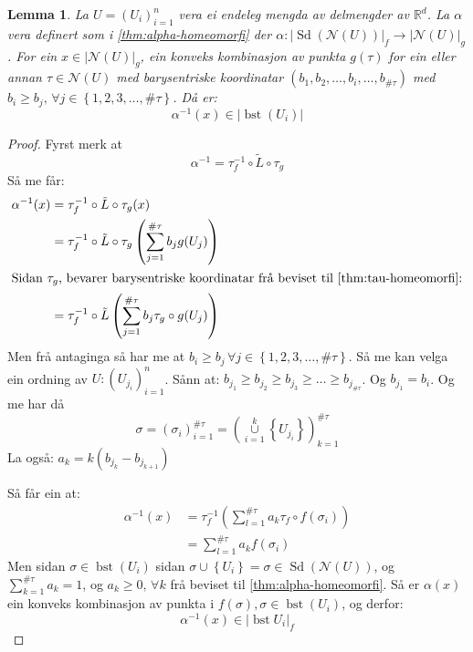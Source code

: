 \documentclass[a4paper, 12pt, norsk]{article}
\theoremstyle{plain}
\newtheorem{lemma}[theorem]{Lemma}
\theoremstyle{definition}
\newcommand{\Rb}{\mathbb{R}}
\newcommand{\Nc}{\mathcal{N}}
\newcommand{\union}{ \mathop{\cup}\limits }
\newcommand{\gr}[1]{ \lvert #1 \rvert } %
\newcommand{\set}[1]{ \left \{ #1 \right \} } %
\newcommand{\tuple}[1]{ \left( #1 \right) } %
\DeclareMathOperator{\Sd}{Sd}
\DeclareMathOperator{\bst}{bst}
\begin{document}
\begin{lemma} \label{thm:bst-betingingar}
	La \( U = \tuple{U_i}_{i=1}^n \) vera ei endeleg mengda av delmengder av \( \Rb^d \). La \( \alpha \) vera definert som i \autoref{thm:alpha-homeomorfi} der \( \alpha: \gr{\Sd(\Nc(U))}_f \to \gr{\Nc(U)}_g \). For ein \( x \in \gr{\Nc(U)}_g \), ein konveks kombinasjon av punkta \( g(\tau) \) for ein eller annan \( \tau \in \Nc(U) \) med barysentriske koordinatar \( \tuple{b_1, b_2,\dots, b_i, \dots, b_{\#\tau}} \) med \( b_i \geq b_j, \, \forall j \in \set{1, 2, 3, \dots, \#\tau} \). Då er:
	\[ 
		\alpha^{-1}(x) \in \gr{\bst(U_i)}
	\]
\end{lemma}

\begin{proof}
	Fyrst merk at
	\[
		\alpha^{-1} = \tau_f^{-1} \circ \tilde{L} \circ \tau_g
	\]
	Så me får:
	\begin{align*}
		\alpha^{-1}(x) &= \tau_f^{-1} \circ \tilde{L} \circ \tau_g (x) \\
		&= \tau_f^{-1} \circ \tilde{L} \circ \tau_g \tuple{\sum_{j=1}^{\#\tau} b_j g(U_j)} \\
		\intertext{Sidan \( \tau_g \), bevarer barysentriske koordinatar frå beviset til \autoref{thm:tau-homeomorfi}:}
		&= \tau_f^{-1} \circ \tilde{L} \tuple{\sum_{j=1}^{\#\tau} b_j \tau_g \circ g(U_j)} \\
	\end{align*}
	Men frå antaginga så har me at \( b_i \geq b_j \, \forall j \in \set{1, 2, 3, \dots, \#\tau} \). Så me kan velga ein ordning av \( U : \tuple{U_{j_i}}_{i=1}^n \). Sånn at: \( b_{j_1} \geq b_{j_2} \geq b_{j_3} \geq \dots \geq b_{j_{\#\tau}} \). Og \( b_{j_1}=b_i \). Og me har då 
	\[
		\sigma = \tuple{\sigma_i}_{i=1}^{\#\tau} = \tuple{\union_{i=1}^k \set{U_{j_i}}}_{k=1}^{\#\tau} 
	\]
	La også: \( a_k = k\tuple{b_{j_k}-b_{j_{k+1}}} \)

	Så får ein at:
	\begin{align*}
		\alpha^{-1}(x) &= \tau_f^{-1} \tuple{\sum_{l=1}^{\#\tau}a_k \tau_f \circ f(\sigma_i)} \\
		&= \sum_{l=1}^{\#\tau} a_k f(\sigma_i)
	\end{align*}
	Men sidan \( \sigma \in \bst(U_i) \) sidan \( \sigma \union \set{U_i} = \sigma \in \Sd(\Nc(U)) \), og \( \sum_{k=1}^{\#\tau} a_k = 1 \), og \( a_k \geq 0, \, \forall k \) frå beviset til \autoref{thm:alpha-homeomorfi}. Så er \( \alpha(x) \) ein konveks kombinasjon av punkta i \( f(\sigma), \sigma \in \bst(U_i) \), og derfor:
	\[
		\alpha^{-1}(x) \in \gr{\bst{U_i}}_f
	\]
\end{proof}
\end{document}

